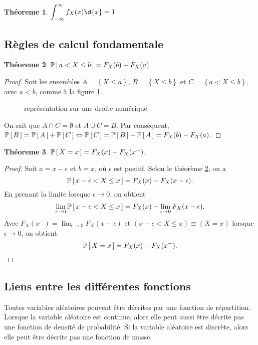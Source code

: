 \documentclass[11pt]{article}
\renewcommand\P[1]{%
	\ensuremath{%
		\mathbb{P}\left[\,#1\,\right]%
	}%
}%
\newtheorem{theoreme}{Théoreme}[section]
\begin{document}
\begin{theoreme}
	$\displaystyle\int_{-\infty}^\infty f_X(x)\d{x}=1$
\end{theoreme}

\subsection{Règles de calcul fondamentale}
\begin{theoreme}\label{th:calc_fond}
	$\P{a<X\leq b}=F_X(b)-F_X(a)$
\end{theoreme}

\begin{proof}
	Soit les ensembles $A=\left\{X\leq a\right\}$, $B=\left\{X\leq b\right\}$
	et $C=\left\{a< X\leq b\right\}$, avec $a<b$, comme à la figure
	\ref{fig:droite_num}.
	\begin{figure}[H]
		\centering
		
		\caption{représentation sur une droite numérique}
		\label{fig:droite_num}
	\end{figure}
	
	On sait que $A\cap C=\emptyset$ et $A\cup C=B$. Par conséquent, 
	$\P{B}=\P{A}+\P{C}\Leftrightarrow\P{C}=\P{B}-\P{A}=F_X(b)-F_X(a)$.
\end{proof}

\begin{theoreme}
	$\P{X=x}=F_X(x)-F_X(x^-)$.
\end{theoreme}

\begin{proof}
	Soit $a=x-\epsilon$ et $b=x$, où $\epsilon$ est positif. Selon le théorème
	\ref{th:calc_fond}, on a
	\begin{equation*}
		\P{x-\epsilon<X\leq x}=F_X(x)-F_X(x-\epsilon).
	\end{equation*}
	En prenant la limite lorsque $\epsilon\rightarrow 0$, on obtient
	\begin{equation*}
		\lim_{\epsilon\rightarrow 0}\P{x-\epsilon<X\leq x}
		=F_X(x)-\lim_{\epsilon\rightarrow 0}F_X(x-\epsilon).
	\end{equation*}
	Avec $F_X(x^-)=\lim_{\epsilon\rightarrow 0}F_X(x-\epsilon)$ et
	$(x-\epsilon<X\leq x)\equiv (X=x)$ lorsque $\epsilon\rightarrow 0$, on
	obtient
	\begin{equation*}
		\P{X=x}=F_X(x)-F_X(x^-).\qedhere
	\end{equation*}
\end{proof}

\subsection{Liens entre les différentes fonctions}
Toutes variables aléatoires peuvent être décrites par une fonction de
répartition. Lorsque la variable aléatoire est continue, alors elle peut aussi
être décrite pas une fonction de densité de probabilité. Si la variable
aléatoire est discrète, alors elle peut être décrite pas une fonction de masse.
\end{document}
